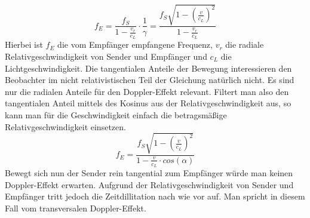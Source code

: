 \begin{equation}
\label{freq_e1}
f_E=\frac{f_S}{1-\frac{v_r}{c_L}}\cdot \frac{1}{\gamma}=\frac{f_S\sqrt{1-\left(\frac{v}{c_L}\right)^2}}{1-\frac{v_r}{c_L}}
\end{equation} 
Hierbei ist \begin{math}{f_E}\end{math} die vom Empfänger empfangene Frequenz, \begin{math}{v_r}\end{math} die radiale Relativgeschwindigkeit von Sender und Empfänger und \begin{math}{c_L}\end{math} die Lichtgeschwindigkeit. Die tangentialen Anteile der Bewegung interessieren den Beobachter im nicht relativistischen Teil der Gleichung natürlich nicht. Es sind nur die radialen Anteile für den Doppler-Effekt relevant. Filtert man also den tangentialen Anteil mittels des Kosinus aus der Relativgeschwindigkeit aus, so kann man für die Geschwindigkeit einfach die betragsmäßige Relativgeschwindigkeit einsetzen.   
\begin{equation}
\label{freq_e2}
f_E=\frac{f_S\sqrt{1-\left(\frac{v}{c_L}\right)^2}}{1-\frac{v}{c_L} \cdot cos(\alpha)}
\end{equation}
Bewegt sich nun der Sender rein tangential zum Empfänger würde man keinen Doppler-Effekt erwarten. Aufgrund der Relativgeschwindigkeit von Sender und Empfänger tritt jedoch die Zeitdillitation nach wie vor auf. Man spricht in diesem Fall vom transversalen Doppler-Effekt.    

